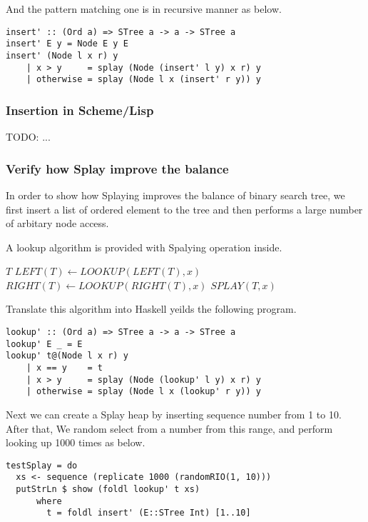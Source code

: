 \documentclass{article}
\begin{document}
And the pattern matching one is in recursive manner as below.

\begin{lstlisting}
insert' :: (Ord a) => STree a -> a -> STree a
insert' E y = Node E y E
insert' (Node l x r) y 
    | x > y     = splay (Node (insert' l y) x r) y
    | otherwise = splay (Node l x (insert' r y)) y
\end{lstlisting}

\subsubsection*{Insertion in Scheme/Lisp}

TODO: ...

\subsubsection{Verify how Splay improve the balance}
In order to show how Splaying improves the balance of binary search
tree, we first insert a list of ordered element to the tree and then
performs a large number of arbitary node access.

A lookup algorithm is provided with Spalying operation inside. 

\begin{algorithmic}[1]
    \State \Return $T$
    \State $LEFT(T) \gets LOOKUP(LEFT(T), x)$
  \Else
    \State $RIGHT(T) \gets LOOKUP(RIGHT(T), x)$
  \EndIf
  \State \Return $SPLAY(T, x)$
\EndFunction
\end{algorithmic}

Translate this algorithm into Haskell yeilds the following program.

\lstset{language=Haskell}
\begin{lstlisting}
lookup' :: (Ord a) => STree a -> a -> STree a
lookup' E _ = E
lookup' t@(Node l x r) y
    | x == y    = t
    | x > y     = splay (Node (lookup' l y) x r) y
    | otherwise = splay (Node l x (lookup' r y)) y
\end{lstlisting}

Next we can create a Splay heap by inserting sequence number from
1 to 10. After that, We random select from a number from this range,
and perform looking up 1000 times as below.

\begin{lstlisting}
testSplay = do
  xs <- sequence (replicate 1000 (randomRIO(1, 10)))
  putStrLn $ show (foldl lookup' t xs)
      where 
        t = foldl insert' (E::STree Int) [1..10]
\end{lstlisting} %
\end{document}
